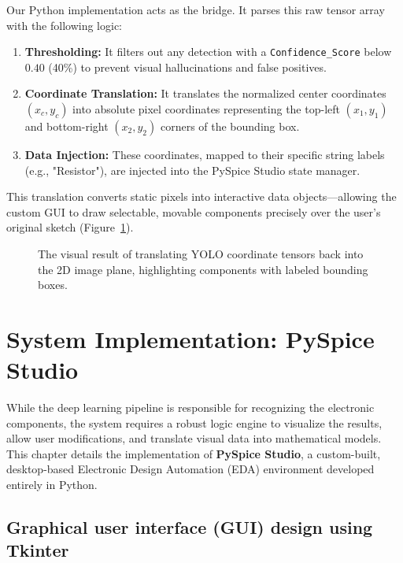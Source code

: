\documentclass[12pt]{article}
\begin{document}
Our Python implementation acts as the bridge. It parses this raw tensor array with the following logic:
\begin{enumerate}
    \item \textbf{Thresholding:} It filters out any detection with a \texttt{Confidence\_Score} below $0.40$ (40\%) to prevent visual hallucinations and false positives.
    \item \textbf{Coordinate Translation:} It translates the normalized center coordinates $(x_c, y_c)$ into absolute pixel coordinates representing the top-left $(x_1, y_1)$ and bottom-right $(x_2, y_2)$ corners of the bounding box.
    \item \textbf{Data Injection:} These coordinates, mapped to their specific string labels (e.g., "Resistor"), are injected into the PySpice Studio state manager.
\end{enumerate}

This translation converts static pixels into interactive data objects—allowing the custom GUI to draw selectable, movable components precisely over the user's original sketch (Figure~\ref{fig:tensor_translation}).

\begin{figure}[H]
    \centering
    \caption{The visual result of translating YOLO coordinate tensors back into the 2D image plane, highlighting components with labeled bounding boxes.}
    \label{fig:tensor_translation}
\end{figure}
\section{System Implementation: PySpice Studio}

While the deep learning pipeline is responsible for recognizing the electronic components, the system requires a robust logic engine to visualize the results, allow user modifications, and translate visual data into mathematical models. This chapter details the implementation of \textbf{PySpice Studio}, a custom-built, desktop-based Electronic Design Automation (EDA) environment developed entirely in Python.

\subsection{Graphical user interface (GUI) design using Tkinter}
\end{document}
